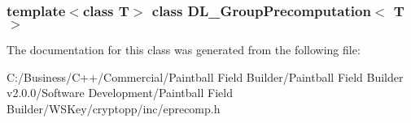 \subsubsection*{template$<$class T$>$ class DL\_\-GroupPrecomputation$<$ T $>$}



The documentation for this class was generated from the following file:\begin{DoxyCompactItemize}
\item 
C:/Business/C++/Commercial/Paintball Field Builder/Paintball Field Builder v2.0.0/Software Development/Paintball Field Builder/WSKey/cryptopp/inc/eprecomp.h\end{DoxyCompactItemize}
